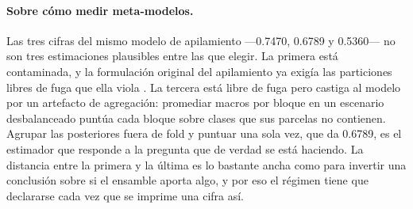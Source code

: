 \paragraph{Sobre cómo medir meta-modelos.}
Las tres cifras del mismo modelo de apilamiento —\num{0.7470}, \num{0.6789} y \num{0.5360}— no son
tres estimaciones plausibles entre las que elegir. La primera está contaminada, y la formulación
original del apilamiento ya exigía las particiones libres de fuga que ella viola
\cite{wolpert1992stacking}. La tercera está libre de fuga pero castiga al modelo por un artefacto
de agregación: promediar macros por bloque en un escenario desbalanceado puntúa cada bloque sobre
clases que sus parcelas no contienen. Agrupar las posteriores fuera de fold y puntuar una sola vez,
que da \num{0.6789}, es el estimador que responde a la pregunta que de verdad se está haciendo. La
distancia entre la primera y la última es lo bastante ancha como para invertir una conclusión sobre
si el ensamble aporta algo, y por eso el régimen tiene que declararse cada vez que se imprime una
cifra así.
